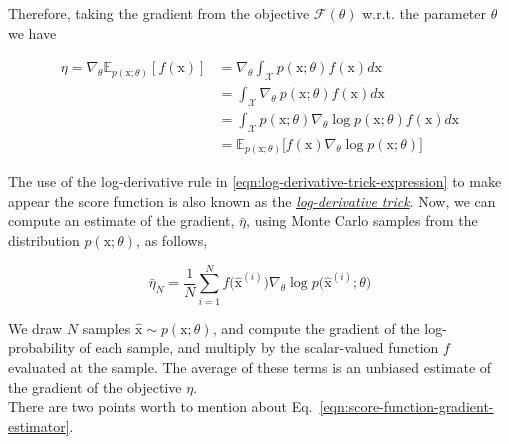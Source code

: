 Therefore, taking the gradient from the objective $\mathcal{F}(\theta)$ w.r.t. the parameter $\theta$ we have

\begin{equation}
    \begin{split}
        \eta = \nabla_{\theta} \mathbb{E}_{p(\mathrm{x};\theta)}[f(\mathrm{x})] &= \nabla_{\theta}\int_{\mathcal{X}} p(\mathrm{x};\theta) f(\mathrm{x}) d\mathrm{x} \\
        &= \int_\mathcal{X} \nabla_{\theta}~p(\mathrm{x}; \theta)f(\mathrm{x})d\mathrm{x} \\
        &= \int_{\mathcal{X}}p(\mathrm{x};\theta)\nabla_{\theta}\log p(\mathrm{x}; \theta) f(\mathrm{x})d\mathrm{x} \\
        &=\mathbb{E}_{p(\mathrm{x};\theta)}\big[f(\mathrm{x})\nabla_{\theta}\log p(\mathrm{x};\theta) \big] 
    \end{split}
\end{equation}

The use of the log-derivative rule in \ref{eqn:log-derivative-trick-expression} to make appear the score function is also known as the
\href{https://blog.shakirm.com/2015/11/machine-learning-trick-of-the-day-5-log-derivative-trick/}{\textit{log-derivative trick}}.
Now, we can compute an estimate of the gradient, $\bar{\eta}$, using Monte Carlo samples from the distribution $p(\mathrm{x};\theta)$, as follows, 

\begin{equation}\label{eqn:score-function-gradient-estimator}
    \bar{\eta}_{N} = \frac{1}{N}\sum_{i=1}^{N}f\big(\hat{\mathrm{x}}^{(i)}\big) \nabla_{\theta}\log p\big(\hat{\mathrm{x}}^{(i)};\theta\big)
\end{equation}

We draw $N$ samples $\hat{\mathrm{x}}\sim p(\mathrm{x};\theta)$, and compute the gradient of the log-probability of each sample, and multiply by the scalar-valued function $f$ evaluated at the sample. The average of these terms is an unbiased estimate of the gradient of the objective $\eta$. \\

There are two points worth to mention about Eq.~\ref{eqn:score-function-gradient-estimator}.

